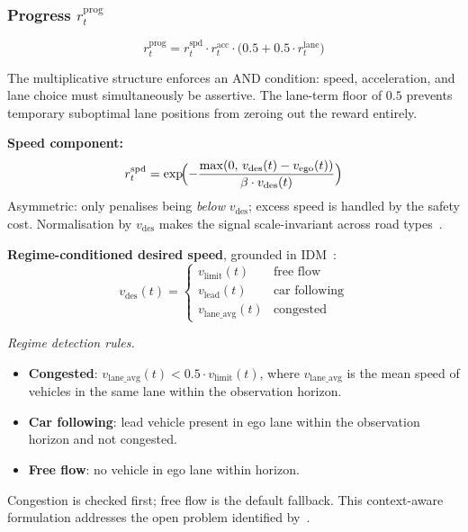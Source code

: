 \documentclass[conference]{IEEEtran}
\begin{document}
\subsubsection{Progress $r^{\text{prog}}_{t}$}

\begin{equation}
r^{\text{prog}}_{t}=r^{\text{spd}}_{t}\cdot r^{\text{acc}}_{t}
  \cdot\bigl(0.5+0.5\cdot r^{\text{lane}}_{t}\bigr)
\label{eq:progress}
\end{equation}

The multiplicative structure enforces an AND condition: speed,
acceleration, and lane choice must simultaneously be assertive.
The lane-term floor of $0.5$ prevents temporary suboptimal lane
positions from zeroing out the reward entirely.

\textbf{Speed component:}
\begin{equation}
r^{\text{spd}}_{t}=\exp\!\Bigl(
  -\frac{\max(0,\,v_{\text{des}}(t)-v_{\text{ego}}(t))}
        {\beta\cdot v_{\text{des}}(t)}\Bigr)
\end{equation}
Asymmetric: only penalises being \emph{below} $v_{\text{des}}$; excess
speed is handled by the safety cost. Normalisation by $v_{\text{des}}$
makes the signal scale-invariant across road
types~\cite{RewardReview2024}.

\textbf{Regime-conditioned desired speed}, grounded in
IDM~\cite{IDM1999,IDM25Years2025}:
\begin{equation}
v_{\text{des}}(t)=\begin{cases}
  v_{\text{limit}}(t)     & \text{free flow}\\
  v_{\text{lead}}(t)      & \text{car following}\\
  v_{\text{lane\_avg}}(t) & \text{congested}
\end{cases}
\label{eq:vdesired}
\end{equation}

\textit{Regime detection rules.}
\begin{itemize}
  \item \textbf{Congested}: $v_{\text{lane\_avg}}(t)<0.5\cdot v_{\text{limit}}(t)$,
    where $v_{\text{lane\_avg}}$ is the mean speed of vehicles in the
    same lane within the observation horizon.
  \item \textbf{Car following}: lead vehicle present in ego lane
    within the observation horizon and not congested.
  \item \textbf{Free flow}: no vehicle in ego lane within horizon.
\end{itemize}
Congestion is checked first; free flow is the default fallback.
This context-aware formulation addresses the open problem identified
by~\cite{RewardReview2024}.
\end{document}
